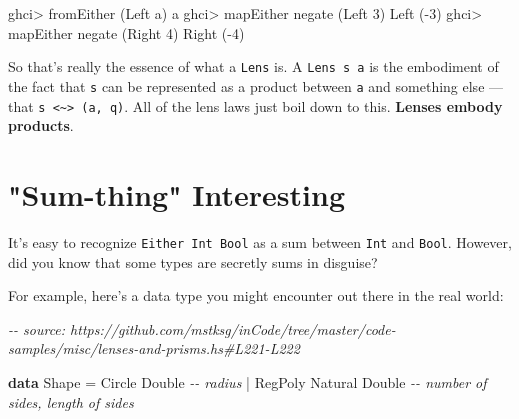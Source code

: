 \documentclass[]{article}
\newenvironment{Shaded}{}{}
\newcommand{\CharTok}[1]{\textcolor[rgb]{0.25,0.44,0.63}{#1}}
\newcommand{\CommentTok}[1]{\textcolor[rgb]{0.38,0.63,0.69}{\textit{#1}}}
\newcommand{\DataTypeTok}[1]{\textcolor[rgb]{0.56,0.13,0.00}{#1}}
\newcommand{\DecValTok}[1]{\textcolor[rgb]{0.25,0.63,0.44}{#1}}
\newcommand{\FunctionTok}[1]{\textcolor[rgb]{0.02,0.16,0.49}{#1}}
\newcommand{\KeywordTok}[1]{\textcolor[rgb]{0.00,0.44,0.13}{\textbf{#1}}}
\newcommand{\NormalTok}[1]{#1}
\newcommand{\OperatorTok}[1]{\textcolor[rgb]{0.40,0.40,0.40}{#1}}
\newcommand{\OtherTok}[1]{\textcolor[rgb]{0.00,0.44,0.13}{#1}}
\begin{document}
\begin{Shaded}
\begin{Highlighting}[]
\NormalTok{ghci}\OperatorTok{>}\NormalTok{ fromEither (}\DataTypeTok{Left} \CharTok{\textquotesingle{}a\textquotesingle{}}\NormalTok{)}
\CharTok{\textquotesingle{}a\textquotesingle{}}
\NormalTok{ghci}\OperatorTok{>}\NormalTok{ mapEither }\FunctionTok{negate}\NormalTok{ (}\DataTypeTok{Left} \DecValTok{3}\NormalTok{)}
\DataTypeTok{Left}\NormalTok{ (}\OperatorTok{{-}}\DecValTok{3}\NormalTok{)}
\NormalTok{ghci}\OperatorTok{>}\NormalTok{ mapEither }\FunctionTok{negate}\NormalTok{ (}\DataTypeTok{Right} \DecValTok{4}\NormalTok{)}
\DataTypeTok{Right}\NormalTok{ (}\OperatorTok{{-}}\DecValTok{4}\NormalTok{)}
\end{Highlighting}
\end{Shaded}

So that's really the essence of what a \texttt{Lens\textquotesingle{}} is. A
\texttt{Lens\textquotesingle{}\ s\ a} is the embodiment of the fact that
\texttt{s} can be represented as a product between \texttt{a} and something else
--- that \texttt{s\ \textless{}\textasciitilde{}\textgreater{}\ (a,\ q)}. All of
the lens laws just boil down to this. \textbf{Lenses embody products}.

\hypertarget{sum-thing-interesting}{%
\section{"Sum-thing" Interesting}\label{sum-thing-interesting}}

It's easy to recognize \texttt{Either\ Int\ Bool} as a sum between \texttt{Int}
and \texttt{Bool}. However, did you know that some types are secretly sums in
disguise?

For example, here's a data type you might encounter out there in the real world:

\begin{Shaded}
\begin{Highlighting}[]
\CommentTok{{-}{-} source: https://github.com/mstksg/inCode/tree/master/code{-}samples/misc/lenses{-}and{-}prisms.hs\#L221{-}L222}

\KeywordTok{data} \DataTypeTok{Shape} \OtherTok{=} \DataTypeTok{Circle}  \DataTypeTok{Double}           \CommentTok{{-}{-} radius}
           \OperatorTok{|} \DataTypeTok{RegPoly} \DataTypeTok{Natural} \DataTypeTok{Double}   \CommentTok{{-}{-} number of sides, length of sides}
\end{Highlighting}
\end{Shaded}
\end{document}

